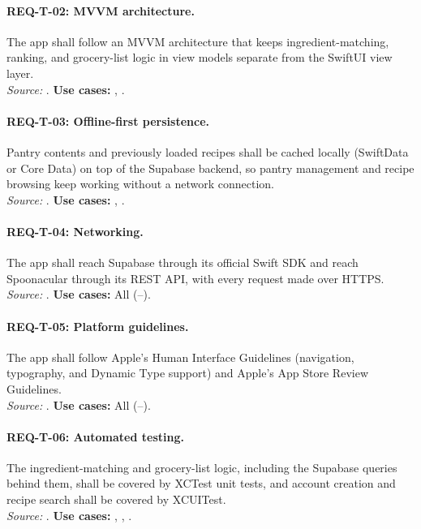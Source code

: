 \paragraph{REQ-T-02: MVVM architecture.}
 The app shall follow an MVVM architecture that keeps ingredient-matching, ranking, and grocery-list logic in view models separate from the SwiftUI view layer.\\
\textit{Source:} . \textbf{Use cases:} , .

\paragraph{REQ-T-03: Offline-first persistence.}
 Pantry contents and previously loaded recipes shall be cached locally (SwiftData or Core Data) on top of the Supabase backend, so pantry management and recipe browsing keep working without a network connection.\\
\textit{Source:} . \textbf{Use cases:} , .

\paragraph{REQ-T-04: Networking.}
 The app shall reach Supabase through its official Swift SDK and reach Spoonacular through its REST API, with every request made over HTTPS.\\
\textit{Source:} . \textbf{Use cases:} All (--).

\paragraph{REQ-T-05: Platform guidelines.}
 The app shall follow Apple's Human Interface Guidelines (navigation, typography, and Dynamic Type support) and Apple's App Store Review Guidelines.\\
\textit{Source:} . \textbf{Use cases:} All (--).

\paragraph{REQ-T-06: Automated testing.}
 The ingredient-matching and grocery-list logic, including the Supabase queries behind them, shall be covered by XCTest unit tests, and account creation and recipe search shall be covered by XCUITest.\\
\textit{Source:} . \textbf{Use cases:} , , .

